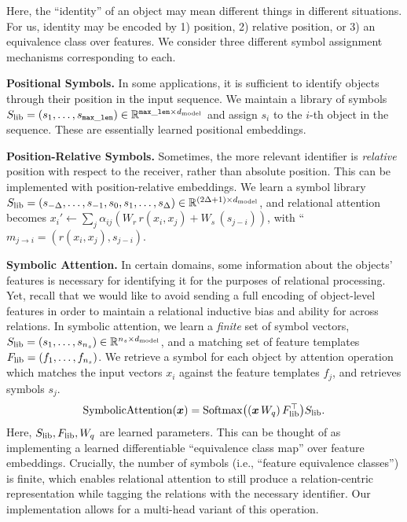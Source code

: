 Here, the ``identity'' of an object may mean different things in different situations. For us, identity may be encoded by 1) position, 2) relative position, or 3) an equivalence class over features. We consider three different symbol assignment mechanisms corresponding to each.

\textbf{Positional Symbols.} In some applications, it is sufficient to identify objects through their position in the input sequence. We maintain a library of symbols $S_\mathrm{lib} = (s_1, \ldots, s_{\mathtt{max\_len}}) \in \mathbb{R}^{\mathtt{max\_len} \times d_{\mathrm{model}}}$ and assign $s_i$ to the $i$-th object in the sequence. These are essentially learned positional embeddings.

\textbf{Position-Relative Symbols.} Sometimes, the more relevant identifier is \textit{relative} position with respect to the receiver, rather than absolute position. This can be implemented with position-relative embeddings. We learn a symbol library $S_\mathrm{lib} = (s_{-\Delta}, \ldots, s_{-1}, s_0, s_1, \ldots, s_{\Delta}) \in \mathbb{R}^{(2 \Delta + 1) \times d_{\mathrm{model}}}$, and relational attention becomes $x_i' \gets \sum_{j} \alpha_{ij} (W_r \, r(x_i, x_j) + W_s \, (s_{j-i}))$, with ``$m_{j \to i} = (r(x_i, x_j), s_{j-i})$.

\textbf{Symbolic Attention.} In certain domains, some information about the objects' features is necessary for identifying it for the purposes of relational processing. Yet, recall that we would like to avoid sending a full encoding of object-level features in order to maintain a relational inductive bias and ability for  across relations. In symbolic attention, we learn a \textit{finite} set of symbol vectors, $S_\mathrm{lib} = (s_1, \ldots, s_{n_s}) \in \mathbb{R}^{n_s \times d_{\mathrm{model}}}$, and a matching set of feature templates $F_\mathrm{lib} = (f_1, \ldots, f_{n_s})$. We retrieve a symbol for each object by attention operation which matches the input vectors 
$x_i$ against the feature templates $f_j$, and retrieves symbols $s_j$.
\begin{equation}
  \mathrm{SymbolicAttention}(\bm{x}) = \mathrm{Softmax}\big((\bm{x} \, W_q)\, F_\mathrm{lib}^\top\big) S_\mathrm{lib}.
\end{equation}
Here, $S_\mathrm{lib}, F_\mathrm{lib}, W_q$ are learned parameters. This can be thought of as implementing a learned differentiable ``equivalence class map'' over feature embeddings. Crucially, the number of symbols (i.e., ``feature equivalence classes'') is finite, which enables relational attention to still produce a relation-centric representation while tagging the relations with the necessary identifier. Our implementation allows for a multi-head variant of this operation.

